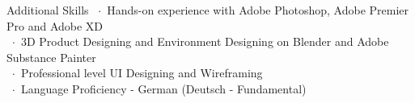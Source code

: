\documentclass{resume} %
\begin{document}
\begin{rSection}{Additional Skills}
~$\cdot$~Hands-on experience with Adobe Photoshop, Adobe Premier Pro and Adobe XD\\
~$\cdot$~3D Product Designing and Environment Designing on Blender and Adobe Substance Painter\\
~$\cdot$~Professional level UI Designing and Wireframing\\
~$\cdot$~Language Proficiency - German (Deutsch - Fundamental)

\end{rSection}
\end{document}
